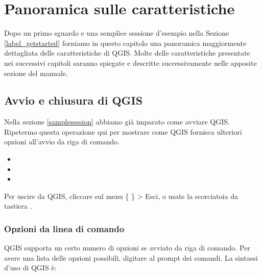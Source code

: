 
\section{Panoramica sulle caratteristiche}\label{feature_glance}


Dopo un primo sguardo e una semplice sessione d'esempio nella Sezione \ref{label_getstarted}
forniamo in questo capitolo una panoramica maggiormente dettagliata delle caratteristiche di QGIS. 
Molte delle caratteristiche presentate nei successivi capitoli saranno spiegate
e descritte successivamente nelle apposite sezione del manuale.

\subsection{Avvio e chiusura di QGIS}\label{label_startinqgis}

Nella sezione \ref{samplesession} abbiamo già imparato come avviare QGIS. Ripetermo 
questa operazione qui per mostrare come QGIS fornisca ulteriori opzioni all'avvio da riga di comando. 

\begin{itemize}
\item {} 
\item {}
\item {}
\end{itemize} 

Per uscire da QGIS, cliccare sul menu \{\nix{} \} > Esci,
o usate la scorciatoia da tastiera .

\subsubsection{Opzioni da linea di comando}
\label{label_commandline}

\nix QGIS supporta un certo numero di opzioni se avviato da riga di comando.
Per avere una lista delle opzioni possibili, digitare  al prompt dei comandi.
La sintassi d'uso di QGIS è:

